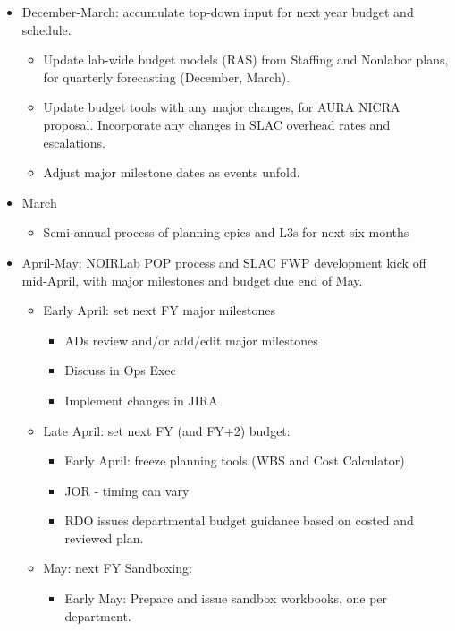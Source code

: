 \begin{itemize}
\item December-March: accumulate top-down input for next year budget and schedule.
   \begin{itemize}
      \item Update lab-wide budget models (\gls{RAS}) from Staffing and Nonlabor plans, for quarterly forecasting (December, March).
      \item Update budget tools with any major changes, for \gls{AURA} \gls{NICRA} proposal. Incorporate any changes in \gls{SLAC} overhead rates and escalations.
      \item Adjust major milestone dates as events unfold.
   \end{itemize}
\item March
   \begin{itemize}
      \item Semi-annual process of planning epics and L3s for next six months
   \end{itemize}
\item April-May: \gls{NOIRLab} \gls{POP} process and \gls{SLAC} \gls{FWP} development kick off mid-April, with major milestones and budget due end of May.
   \begin{itemize}
      \item Early April: set next \gls{FY} major milestones
         \begin{itemize}
            \item \glspl{AD} review and/or add/edit major milestones
            \item Discuss in Ops Exec
            \item Implement changes in \gls{JIRA}
         \end{itemize}
      \item Late April: set next \gls{FY} (and \gls{FY}+2) budget:
         \begin{itemize}
            \item Early April: freeze planning tools (\gls{WBS} and Cost Calculator)
            \item \gls{JOR} - timing can vary
            \item \gls{RDO} issues departmental budget guidance based on costed and reviewed plan.
         \end{itemize}
      \item May: next \gls{FY} Sandboxing:
         \begin{itemize}
            \item Early May: Prepare and issue sandbox workbooks, one per department.

\end{itemize}
\end{itemize}
\end{itemize}
